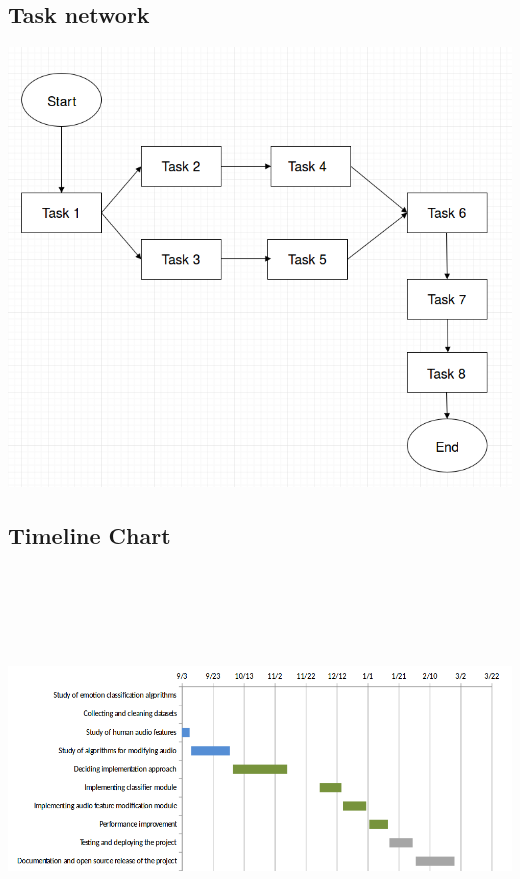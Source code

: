 \documentclass[oneside,a4paper,12pt]{book}
\begin{document}
\subsection{Task network}  
\vspace*{1\baselineskip}
\includegraphics[width=400pt]{task_network.png}
\subsection{Timeline Chart}  
\includegraphics[height=300pt,width=480pt]{gantt_chart.png}
\end{document}
